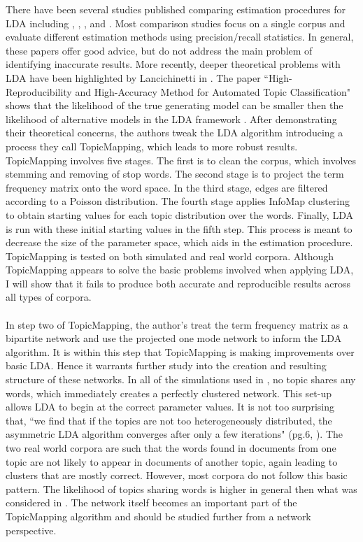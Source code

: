 \documentclass[12pt]{article}
\begin{document}
There have been several studies published comparing estimation procedures for LDA including \cite{BleiComp}, \cite{Comp}, \cite{CVB}, and \cite{Comp2}. Most comparison studies focus on a single corpus and evaluate different estimation methods using precision/recall statistics. In general, these papers offer good advice, but do not address the main problem of identifying inaccurate results. More recently, deeper theoretical problems with LDA have been highlighted by Lancichinetti in \cite{main}. The paper ``High-Reproducibility and High-Accuracy Method for Automated Topic Classification" shows that the likelihood of the true generating model can be smaller then the likelihood of alternative models in the LDA framework \cite{main}. After demonstrating their theoretical concerns, the authors tweak the LDA algorithm introducing a process they call TopicMapping, which leads to more robust results. TopicMapping involves five stages. The first is to clean the corpus, which involves stemming and removing of stop words. The second stage is to project the term frequency matrix onto the word space. In the third stage, edges are filtered according to a Poisson distribution. The fourth stage applies InfoMap clustering to obtain starting values for each topic distribution over the words. Finally, LDA is run with these initial starting values in the fifth step. This process is meant to decrease the size of the parameter space, which aids in the estimation procedure. TopicMapping is tested on both simulated and real world corpora. Although TopicMapping appears to solve the basic problems involved when applying LDA, I will show that it fails to produce both accurate
\noindent and reproducible results across all types of corpora.   
\\
\\
In step two of TopicMapping, the author's treat the term frequency matrix as a bipartite network and use the projected one mode network to inform the LDA algorithm. It is within this step that TopicMapping is making improvements over basic LDA. Hence it warrants further study into the creation and resulting structure of these networks. In all of the simulations used in \cite{main}, no topic shares any words, which immediately creates a perfectly clustered network. This set-up allows LDA to begin at the correct parameter values. It is not too surprising that, ``we find that if the topics
are not too heterogeneously distributed, the asymmetric LDA algorithm converges after only a few iterations" (pg.6, \cite{main}). The two real world corpora are such that the words found in documents from one topic are not likely to appear in documents of another topic, again leading to clusters that are mostly correct. However, most corpora do not follow this basic pattern. The likelihood of topics sharing words is higher in general then what was considered in \cite{mian}. The network itself becomes an important part of the TopicMapping algorithm and should be studied further from a network perspective. 
\end{document}
